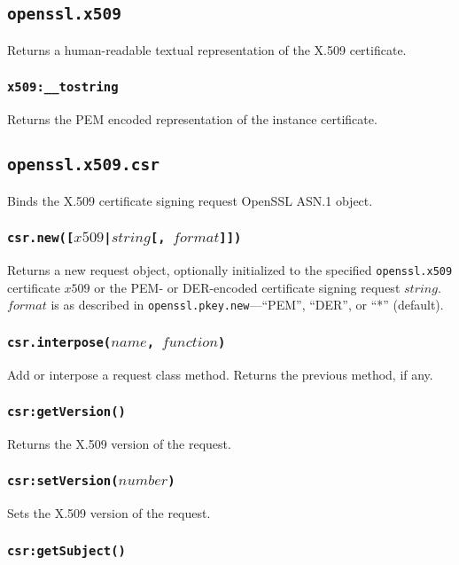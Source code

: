 \documentclass[11pt, oneside]{memoir}
\newcommand*{\fn}[1]{\texttt{#1}\xspace}
\newcommand*{\module}[1]{\texttt{#1}\xspace}
\newcounter{toccols}
\newenvironment{Module}[1]{
	\subsection{\texttt{#1}}
	\addtocontents{toc}{
		\protect\begin{multicols}{\value{toccols}}
	}
}{
	\addtocontents{toc}{\protect\end{multicols}}
}
\begin{document}
\begin{Module}{openssl.x509}
Returns a human-readable textual representation of the X.509 certificate.

\subsubsection[\fn{x509:\_\_tostring}]{\fn{x509:\_\_tostring}}

Returns the PEM encoded representation of the instance certificate.

\end{Module}


\begin{Module}{openssl.x509.csr}

Binds the X.509 certificate signing request OpenSSL ASN.1 object.

\subsubsection[\fn{csr.new}]{\fn{csr.new([$x509$|$string$[, $format$]])}}

Returns a new request object, optionally initialized to the specified \module{openssl.x509} certificate $x509$ or the PEM- or DER-encoded certificate signing request $string$. $format$ is as described in \fn{openssl.pkey.new}---``PEM'', ``DER'', or ``*'' (default).

\subsubsection[\fn{csr.interpose}]{\fn{csr.interpose($name$, $function$)}}

Add or interpose a request class method. Returns the previous method, if any.

\subsubsection[\fn{csr:getVersion}]{\fn{csr:getVersion()}}

Returns the X.509 version of the request.

\subsubsection[\fn{csr:setVersion}]{\fn{csr:setVersion($number$)}}

Sets the X.509 version of the request.

\subsubsection[\fn{csr:getSubject}]{\fn{csr:getSubject()}}


\end{Module}
\end{document}
